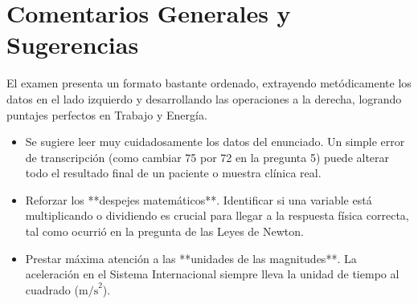 \documentclass[12pt,letterpaper]{article}
\begin{document}
\section*{Comentarios Generales y Sugerencias}
El examen presenta un formato bastante ordenado, extrayendo metódicamente los datos en el lado izquierdo y desarrollando las operaciones a la derecha, logrando puntajes perfectos en Trabajo y Energía.
\begin{itemize}
    \item Se sugiere leer muy cuidadosamente los datos del enunciado. Un simple error de transcripción (como cambiar 75 por 72 en la pregunta 5) puede alterar todo el resultado final de un paciente o muestra clínica real.
    \item Reforzar los **despejes matemáticos**. Identificar si una variable está multiplicando o dividiendo es crucial para llegar a la respuesta física correcta, tal como ocurrió en la pregunta de las Leyes de Newton.
    \item Prestar máxima atención a las **unidades de las magnitudes**. La aceleración en el Sistema Internacional siempre lleva la unidad de tiempo al cuadrado ($\text{m/s}^2$).
\end{itemize}
\end{document}
